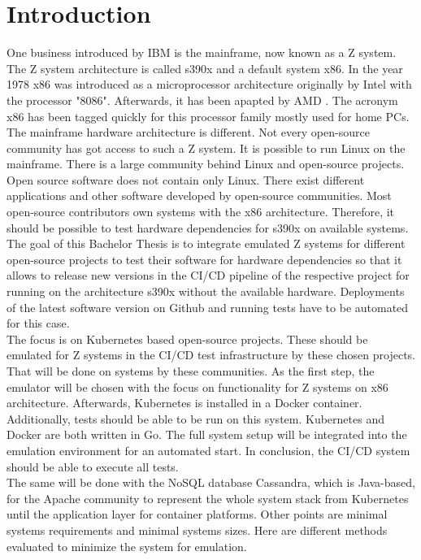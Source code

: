 \chapter{Introduction}\label{ch:intro}

One business introduced by IBM is the mainframe, now known as a Z system. The Z system architecture is called \gls{s390x} and a default system \gls{x86}. 
In the year 1978 x86 was introduced as a microprocessor architecture originally by Intel with the processor "8086". Afterwards, it has been apapted by AMD \cite{Ostler2020}. The acronym x86 has been tagged quickly for this processor family mostly used for home PCs. 
The mainframe hardware architecture is different. Not every open-source community has got access to such a Z system. It is possible to run Linux on the mainframe. There is a large community behind Linux and open-source projects. Open source software does not contain only \gls{Linux}. There exist different applications and other software developed by open-source communities. Most open-source contributors own systems with the x86 architecture. Therefore, it should be possible to test hardware dependencies for s390x on available systems. The goal of this Bachelor Thesis is to integrate emulated Z systems for different open-source projects to test their software for hardware dependencies so that it allows to release new versions in the CI/CD pipeline of the respective project for running on the architecture s390x without the available hardware. Deployments of the latest software version on Github and running tests have to be automated for this case.\\
The focus is on Kubernetes based open-source projects. These should be emulated for Z systems in the \gls{CI/CD} test infrastructure by these chosen projects. That will be done on systems by these communities. As the first step, the emulator will be chosen with the focus on functionality for Z systems on x86 architecture. Afterwards, Kubernetes is installed in a Docker container. Additionally, tests should be able to be run on this system. Kubernetes and Docker are both written in Go. The full system setup will be integrated into the emulation environment for an automated start. In conclusion, the CI/CD system should be able to execute all tests. \\
The same will be done with the NoSQL database Cassandra, which is Java-based, for the Apache community to represent the whole system stack from Kubernetes until the \gls{application layer} for container platforms. Other points are minimal systems requirements and minimal systems sizes. Here are different methods evaluated to minimize the system for emulation.


